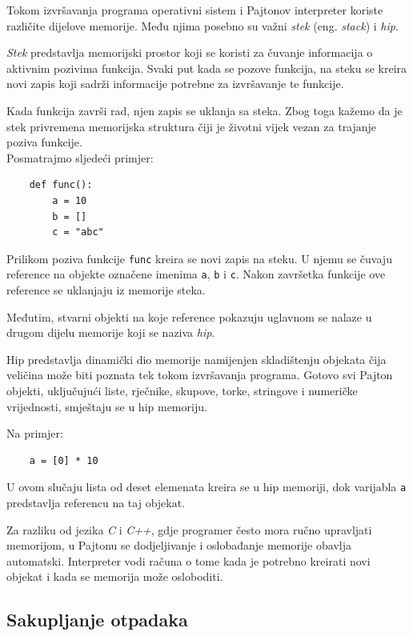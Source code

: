 Tokom izvršavanja programa operativni sistem i Pajtonov interpreter koriste različite dijelove memorije. Među njima posebno su važni \textit{stek} (eng. \textit{stack}) i \textit{hip}.

\textit{Stek} predstavlja memorijski prostor koji se koristi za čuvanje informacija o aktivnim pozivima funkcija. Svaki put kada se pozove funkcija, na steku se kreira novi zapis koji sadrži informacije potrebne za izvršavanje te funkcije.

Kada funkcija završi rad, njen zapis se uklanja sa steka. Zbog toga kažemo da je stek privremena memorijska struktura čiji je životni vijek vezan za trajanje poziva funkcije.\\

Posmatrajmo sljedeći primjer:

\begin{verbatim}
	def func():
	    a = 10
	    b = []
	    c = "abc"
\end{verbatim}

Prilikom poziva funkcije \texttt{func} kreira se novi zapis na steku. U njemu se čuvaju reference na objekte označene imenima \texttt{a}, \texttt{b} i \texttt{c}. Nakon završetka funkcije ove reference se uklanjaju iz memorije steka.

Međutim, stvarni objekti na koje reference pokazuju uglavnom se nalaze u drugom dijelu memorije koji se naziva \textit{hip}.

Hip predstavlja dinamički dio memorije namijenjen skladištenju objekata čija veličina može biti poznata tek tokom izvršavanja programa. Gotovo svi Pajton objekti, uključujući liste, rječnike, skupove, torke, stringove i numeričke vrijednosti, smještaju se u hip memoriju.

Na primjer:
\begin{verbatim}
	a = [0] * 10
\end{verbatim}

U ovom slučaju lista od deset elemenata kreira se u hip memoriji, dok varijabla \texttt{a} predstavlja referencu na taj objekat.

Za razliku od jezika \textit{C} i \textit{C++}, gdje programer često mora ručno upravljati memorijom, u Pajtonu se dodjeljivanje i oslobađanje memorije obavlja automatski. Interpreter vodi računa o tome kada je potrebno kreirati novi objekat i kada se memorija može osloboditi.

\subsection{Sakupljanje otpadaka}

